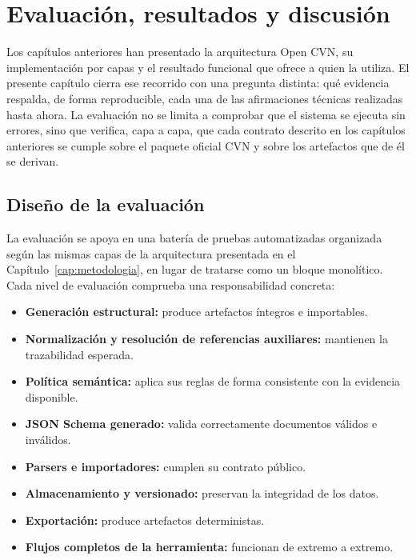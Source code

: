 \chapter{Evaluación, resultados y discusión}
\label{cap:evaluacion}

Los capítulos anteriores han presentado la arquitectura Open CVN, su
implementación por capas y el resultado funcional que ofrece a quien la
utiliza. El presente capítulo cierra ese recorrido con una pregunta distinta:
qué evidencia respalda, de forma reproducible, cada una de las afirmaciones
técnicas realizadas hasta ahora. La evaluación no se limita a comprobar que
el sistema se ejecuta sin errores, sino que verifica, capa a capa, que cada
contrato descrito en los capítulos anteriores se cumple sobre el paquete
oficial CVN y sobre los artefactos que de él se derivan.

\section{Diseño de la evaluación}
\label{sec:evaluacion_diseno}

La evaluación se apoya en una batería de pruebas automatizadas organizada
según las mismas capas de la arquitectura presentada en el
Capítulo~\ref{cap:metodologia}, en lugar de tratarse como un bloque
monolítico. Cada nivel de evaluación comprueba una responsabilidad concreta:

\begin{itemize}
  \item \textbf{Generación estructural:} produce artefactos íntegros e
  importables.

  \item \textbf{Normalización y resolución de referencias auxiliares:}
  mantienen la trazabilidad esperada.

  \item \textbf{Política semántica:} aplica sus reglas de forma consistente
  con la evidencia disponible.

  \item \textbf{JSON Schema generado:} valida correctamente documentos
  válidos e inválidos.

  \item \textbf{Parsers e importadores:} cumplen su contrato público.

  \item \textbf{Almacenamiento y versionado:} preservan la integridad de los
  datos.

  \item \textbf{Exportación:} produce artefactos deterministas.

  \item \textbf{Flujos completos de la herramienta:} funcionan de extremo a
  extremo.
\end{itemize}

